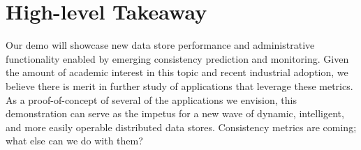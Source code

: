 \section{High-level Takeaway}

Our demo will showcase new data store performance and
administrative functionality enabled by emerging consistency
prediction and monitoring. Given the amount of academic interest in
this topic and recent industrial adoption, we believe there is merit
in further study of applications that leverage these metrics. As a
proof-of-concept of several of the applications we envision, this
demonstration can serve as the impetus for a new wave of dynamic,
intelligent, and more easily operable distributed data
stores. Consistency metrics are coming; what else can we do with them?
